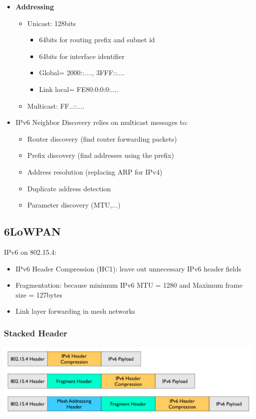 \begin{itemize}
    \item \textbf{Addressing}
        \begin{itemize}
            \item Unicast: 128bits
                \begin{itemize}
                    \item 64bits for routing prefix and subnet id
                    \item 64bits for interface identifier
                    \item Global= 2000::...., 3FFF::....
                    \item Link local= FE80:0:0:0:....
                \end{itemize}
            \item Multicast: FF..::....
        \end{itemize}
    \item IPv6 Neighbor Discovery relies on multicast messages to:
        \begin{itemize}
            \item Router discovery (find router forwarding packets)
            \item Prefix discovery (find addresses using the prefix)
            \item Address resolution (replacing ARP for IPv4)
            \item Duplicate address detection
            \item Parameter discovery (MTU,...)
        \end{itemize}
\end{itemize}

\subsection{6LoWPAN}
IPv6 on 802.15.4:
\begin{itemize}
    \item IPv6 Header Compression (HC1): leave out unnecessary IPv6 header fields
    \item Fragmentation: because minimum IPv6 MTU = 1280 and Maximum
        frame size = 127bytes
    \item Link layer forwarding in mesh networks
\end{itemize}


\subsubsection{Stacked Header}
\begin{center}
    \includegraphics[width=0.7\linewidth]{img/stacked.png}
\end{center}

